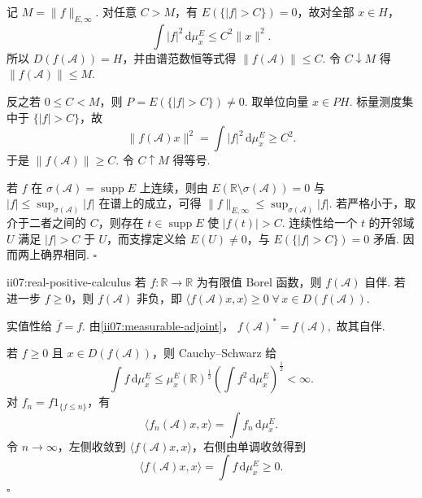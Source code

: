 \begin{FAProof}
记 \(\displaystyle M=\|f\|_{E,\infty}\). 对任意 \(\displaystyle C>M\)，有 \(\displaystyle E(\{|f|>C\})=0\)，故对全部 \(\displaystyle x\in H\)，
\[
\int|f|^2\,\mathrm{d}\mu_x^E\leqslant C^2\|x\|^2.
\]
所以 \(\displaystyle D(f(\mathcal A))=H\)，并由谱范数恒等式得 \(\displaystyle\|f(\mathcal A)\|\leqslant C\). 令 \(\displaystyle C\downarrow M\) 得 \(\displaystyle\|f(\mathcal A)\|\leqslant M\).

反之若 \(\displaystyle0\leqslant C<M\)，则 \(\displaystyle P=E(\{|f|>C\})\neq0\). 取单位向量 \(\displaystyle x\in PH\). 标量测度集中于 \(\displaystyle\{|f|>C\}\)，故
\[
\|f(\mathcal A)x\|^2
=
\int|f|^2\,\mathrm{d}\mu_x^E
\geqslant
C^2.
\]
于是 \(\displaystyle\|f(\mathcal A)\|\geqslant C\). 令 \(\displaystyle C\uparrow M\) 得等号.

若 \(\displaystyle f\) 在 \(\displaystyle\sigma(\mathcal A)=\operatorname{supp}E\) 上连续，则由 \(\displaystyle E(\mathbb R\setminus\sigma(\mathcal A))=0\) 与 \(\displaystyle |f|\leqslant\sup_{\sigma(\mathcal A)}|f|\) 在谱上的成立，可得 \(\displaystyle\|f\|_{E,\infty}\leqslant\sup_{\sigma(\mathcal A)}|f|\). 若严格小于，取介于二者之间的 \(\displaystyle C\)，则存在 \(\displaystyle t\in\operatorname{supp}E\) 使 \(\displaystyle|f(t)|>C\). 连续性给一个 \(\displaystyle t\) 的开邻域 \(\displaystyle U\) 满足 \(\displaystyle|f|>C\) 于 \(\displaystyle U\)，而支撑定义给 \(\displaystyle E(U)\neq0\)，与 \(\displaystyle E(\{|f|>C\})=0\) 矛盾. 因而两上确界相同.
\hfill\(\square\)
\end{FAProof}

\begin{FAProposition}[B][实值与非负可测函数]{ii07:real-positive-calculus}
若 \(\displaystyle f:\mathbb R\to\mathbb R\) 为有限值 Borel 函数，则 \(\displaystyle f(\mathcal A)\) 自伴. 若进一步 \(\displaystyle f\geqslant0\)，则 \(\displaystyle f(\mathcal A)\) 非负，即
\(\displaystyle \langle f(\mathcal A)x,x\rangle\geqslant0 \; \forall\,x\in D(f(\mathcal A)).\)
\end{FAProposition}

\begin{FAProof}
实值性给 \(\displaystyle\overline f=f\). 由\autoref{ii07:measurable-adjoint}，
\(\displaystyle f(\mathcal A)^*=f(\mathcal A),\)
故其自伴.

若 \(\displaystyle f\geqslant0\) 且 \(\displaystyle x\in D(f(\mathcal A))\)，则 Cauchy--Schwarz 给
\[
\int f\,\mathrm{d}\mu_x^E
\leqslant
\mu_x^E(\mathbb R)^{\frac{1}{2}}
\left(\int f^2\,\mathrm{d}\mu_x^E\right)^{\frac{1}{2}}
<\infty.
\]
对 \(\displaystyle f_n=f1_{\{f\leqslant n\}}\)，有
\[
\langle f_n(\mathcal A)x,x\rangle
=
\int f_n\,\mathrm{d}\mu_x^E.
\]
令 \(\displaystyle n\to\infty\)，左侧收敛到 \(\displaystyle\langle f(\mathcal A)x,x\rangle\)，右侧由单调收敛得到
\[
\langle f(\mathcal A)x,x\rangle
=
\int f\,\mathrm{d}\mu_x^E
\geqslant0.\]
\hfill\(\square\)


\end{FAProof}

